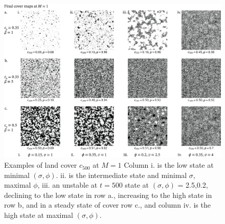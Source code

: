 \documentclass[10pt]{article}
\begin{document}
\begin{figure}
 	\begin{center}
		\includegraphics{f4_cartes_trois_niveaux.png}
	\end{center}
		\caption{Examples of land cover $c_{500}$ at $M = 1$ Column i. is the low state at minimal $(\sigma,\phi)$. ii. is the intermediate state and minimal $\sigma$, maximal $\phi$, iii. an unstable at $t = {500}$ state at $(\sigma,\phi)$ = 2.5,0.2, declining to the low state in row a., increasing to the high state in row b, and in a steady state of cover row c., and column iv. is the high state at maximal $(\sigma,\phi)$.}
\end{figure}
\end{document}
